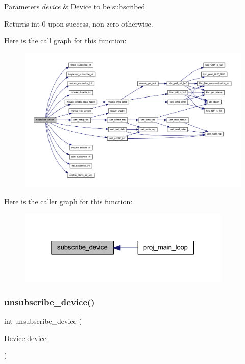 \begin{DoxyParams}{Parameters}
{\em device} & Device to be subscribed. \\
\hline
\end{DoxyParams}
\begin{DoxyReturn}{Returns}
int 0 upon success, non-\/zero otherwise. 
\end{DoxyReturn}
Here is the call graph for this function\+:
\nopagebreak
\begin{figure}[H]
\begin{center}
\leavevmode
\includegraphics[width=350pt]{group__interrupts_ga52c0411fc9786e0c38241ab3584c7dd8_cgraph}
\end{center}
\end{figure}
Here is the caller graph for this function\+:\nopagebreak
\begin{figure}[H]
\begin{center}
\leavevmode
\includegraphics[width=289pt]{group__interrupts_ga52c0411fc9786e0c38241ab3584c7dd8_icgraph}
\end{center}
\end{figure}
\mbox{\label{group__interrupts_gac34cc7680c64171b47100c01bb019ab4}} 
\subsubsection{\texorpdfstring{unsubscribe\+\_\+device()}{unsubscribe\_device()}}
{\footnotesize\ttfamily int unsubscribe\+\_\+device (\begin{DoxyParamCaption}\item[{\mbox{\hyperlink{group__interrupts_gadb53a8cc97236ca207c035241a5b7fb8}{Device}}}]{device }\end{DoxyParamCaption})}



